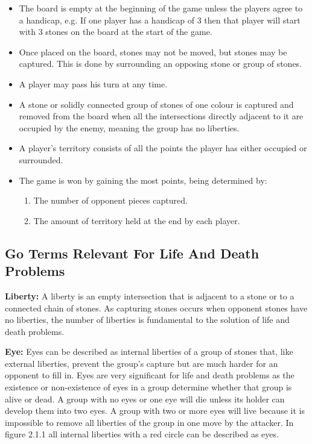 \documentclass{l3proj}
\begin{document}
\begin{itemize}
\item The board is empty at the beginning of the game unless the players agree to a handicap, e.g. If one player has a handicap of 3 then that player will start with 3 stones on the board at the start of the game.
\item Once placed on the board, stones may not be moved, but stones may be captured. This is done by surrounding an opposing stone or group of stones. 
\item A player may pass his turn at any time.
\item A stone or solidly connected group of stones of one colour is captured and removed from the board when all the intersections directly adjacent to it are occupied by the enemy, meaning the group has no liberties.
\item A player's territory consists of all the points the player has either occupied or surrounded.
\item  The game is won by gaining the most points, being determined by:
\begin{enumerate}
\item The number of opponent pieces captured.
\item The amount of territory held at the end by each player.
\end{enumerate}
\end{itemize}

\subsection{Go Terms Relevant For Life And Death Problems}

\textbf{Liberty:} A liberty is an empty intersection that is adjacent to a stone or to a connected chain of stones. As capturing stones occurs when opponent stones have no liberties, the number of liberties is fundamental to the solution of life and death problems.  

\textbf{Eye:} Eyes can be described as internal liberties of a group of stones that, like external liberties, prevent the group's capture but are much harder for an opponent to fill in. Eyes are very significant for life and death problems as the existence or non-existence of eyes in a group determine whether that group is alive or dead. A group with no eyes or one eye will die unless its holder can develop them into two eyes. A group with two or more eyes will live because it is impossible to remove all liberties of the group in one move by the attacker. In figure 2.1.1 all internal liberties with a red circle can be described as eyes.
\end{document}
